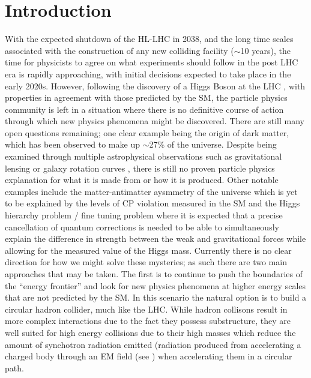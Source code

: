 \chapter{Introduction}

With the expected shutdown of the \ac{HL-LHC} in 2038, and the long time scales associated with the construction of any new colliding facility ($\sim$10 years), the time for physicists to agree on what experiments should follow in the post \ac{LHC} era is rapidly approaching, with initial decisions expected to take place in the early 2020s. However, following the discovery of a Higgs Boson at the \ac{LHC} \cite{:2012gk,Chatrchyan:2012xdj}, with properties in agreement with those predicted by the \ac{SM}, the particle physics community is left in a situation where there is no definitive course of action through which new physics phenomena might be discovered. There are still many open questions remaining; one clear example being the origin of dark matter, which has been observed to make up $\sim$27\% of the universe. Despite being examined through multiple astrophysical observations such as gravitational lensing or galaxy rotation curves \cite{Trimble:1987ee}, there is still no proven particle physics explanation for what it is made from or how it is produced. Other notable examples include the matter-antimatter aysmmetry of the universe which is yet to be explained by the levels of CP violation measured in the \ac{SM} and the Higgs hierarchy problem / fine tuning problem where it is expected that a precise cancellation of quantum corrections is needed to be able to simultaneously explain the difference in strength between the weak and gravitational forces while allowing for the measured value of the Higgs mass. Currently there is no clear direction for how we might solve these mysteries; as such there are two main approaches that may be taken. The first is to continue to push the boundaries of the ``energy frontier'' and look for new physics phenomena at higher energy scales that are not predicted by the \ac{SM}. In this scenario the natural option is to build a circular hadron collider, much like the \ac{LHC}. While hadron collisons result in more complex interactions due to the fact they possess substructure, they are well suited for high energy collisions due to their high masses which reduce the amount of synchotron radiation emitted (radiation produced from accelerating a charged body through an \ac{EM} field (see ) when accelerating them in a circular path.

